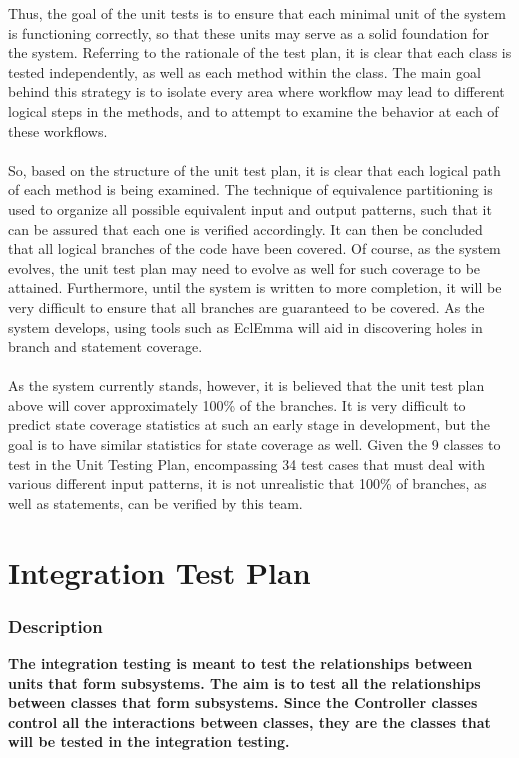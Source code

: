\documentclass[12pt]{report}
\begin{document}
    Thus, the goal of the unit tests is to ensure that each minimal unit of the system is
    functioning correctly, so that these units may serve as a solid foundation for the system.
    Referring to the rationale of the test plan, it is clear that each class is tested
    independently, as well as each method within the class. The main goal behind this strategy is to
    isolate every area where workflow may lead to different logical steps in the methods, and to
    attempt to examine the behavior at each of these workflows.\\\\
    So, based on the structure of the unit test plan, it is clear that each logical path of each
    method is being examined. The technique of equivalence partitioning is used to organize all
    possible equivalent input and output patterns, such that it can be assured that each one is
    verified accordingly. It can then be concluded that all logical
    branches of the code have been covered. Of course, as the system evolves, the unit test plan may
    need to evolve as well for such coverage to be attained. Furthermore, until the system is
    written to more completion, it will be very difficult to ensure that all branches are guaranteed
    to be covered. As the system develops, using tools such as EclEmma will aid in discovering holes
    in branch and statement coverage.\\\\
    As the system currently stands, however, it is believed that the unit test plan above will cover
    approximately 100\% of the branches. It is very difficult to predict state coverage statistics
    at such an early stage in development, but the goal is to have similar statistics for state
    coverage as well. Given the 9 classes to test in the Unit Testing Plan, encompassing 34 test
    cases that must deal with various different input patterns, it is not unrealistic that 100\% of
    branches, as well as statements, can be verified by this team.
    
\part{Integration Test Plan}
\section{Description}
\textbf{The integration testing is meant to test the relationships between units that form
subsystems. The aim is to test all the relationships between classes that form subsystems. Since the
Controller classes control all the interactions between classes, they are the classes that will be tested in
the integration testing.}
\end{document}
